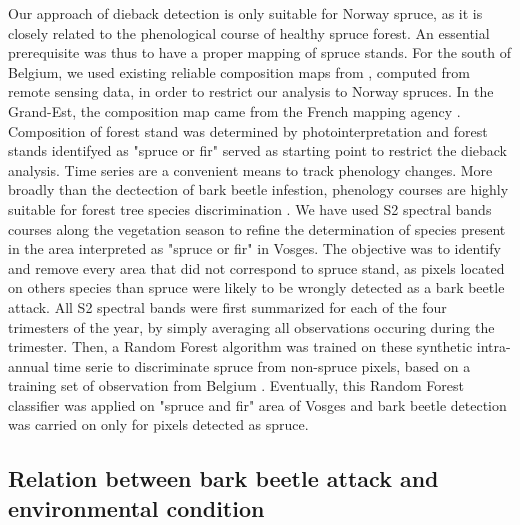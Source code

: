 \documentclass[3p,procedia]{elsarticle}
\begin{document}
Our approach of dieback detection is only suitable for Norway spruce, as it is closely related to the phenological course of healthy spruce forest.
An essential prerequisite was thus to have a proper mapping of spruce stands.
For the south of Belgium, we used existing reliable composition maps from \cite{bolyn_mapping_2022}, computed from remote sensing data, in order to restrict our analysis to Norway spruces.
In the Grand-Est, the composition map came from the French mapping agency \citep{IGN_bd_2018}. 
Composition of forest stand was determined by photointerpretation and forest stands identifyed as "spruce or fir" served as starting point to restrict the dieback analysis.
Time series are a convenient means to track phenology changes. 
More broadly than the dectection of bark beetle infestion, phenology courses are highly suitable for forest tree species discrimination \citep{lisein_discrimination_2015,grabska_forest_2019,ma_tree_2021}.
We have used S2 spectral bands courses along the vegetation season to refine the determination of species present in the area interpreted as "spruce or fir" in Vosges.
The objective was to identify and remove every area that did not correspond to spruce stand, as pixels located on others species than spruce were likely to be wrongly detected as a bark beetle attack.
All S2 spectral bands were first summarized for each of the four trimesters of the year, by simply averaging all observations occuring during the trimester.
Then, a Random Forest algorithm was trained on these synthetic intra-annual time serie to discriminate spruce from non-spruce pixels, based on a training set of observation from Belgium \citep{bolyn_forest_2018}.
Eventually, this Random Forest classifier was applied on "spruce and fir" area of Vosges and bark beetle detection was carried on only for pixels detected as spruce. 

\subsection{Relation between bark beetle attack and environmental condition}



\end{document}
